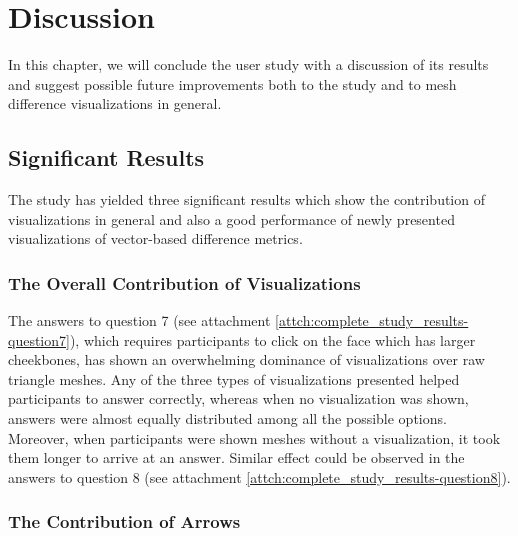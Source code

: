 \chapter{Discussion}
\label{chap:discussion}

In this chapter, we will conclude the user study with a discussion of its results and suggest possible future improvements both to the study and to mesh difference visualizations in general.

\section{Significant Results}
\label{sec:discussion-sig_results}

The study has yielded three significant results which show the contribution of visualizations in general and also a good performance of newly presented visualizations of vector-based difference metrics.

\subsection{The Overall Contribution of Visualizations}
\label{subsec:discussion-sig_results-overall_contrib}

The answers to question 7 (see attachment \ref{attch:complete_study_results-question7}), which requires participants to click on the face which has larger cheekbones, has shown an overwhelming dominance of visualizations over raw triangle meshes. Any of the three types of visualizations presented helped participants to answer correctly, whereas when no visualization was shown, answers were almost equally distributed among all the possible options. Moreover, when participants were shown meshes without a visualization, it took them longer to arrive at an answer. Similar effect could be observed in the answers to question 8 (see attachment \ref{attch:complete_study_results-question8}).

\subsection{The Contribution of Arrows}
\label{subsec:discussion-sig_results-arrow_contrib}

